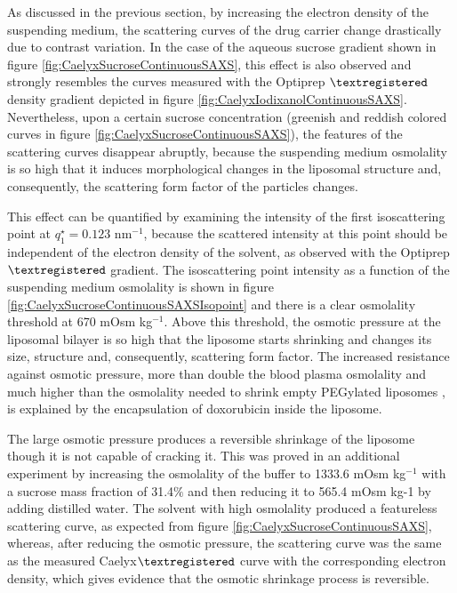 As discussed in the previous section, by increasing the electron density of the suspending medium, the scattering curves of the drug carrier change drastically due to contrast variation. In the case of the aqueous sucrose gradient shown in figure \ref{fig:CaelyxSucroseContinuousSAXS}, this effect is also observed and strongly resembles the curves measured with the Optiprep $\textregistered$ density gradient depicted in figure \ref{fig:CaelyxIodixanolContinuousSAXS}. Nevertheless, upon a certain sucrose concentration (greenish and reddish colored curves in figure \ref{fig:CaelyxSucroseContinuousSAXS}), the features of the scattering curves disappear abruptly, because the suspending medium osmolality is so high that it induces morphological changes in the liposomal structure and, consequently, the scattering form factor of the particles changes.

This effect can be quantified by examining the intensity of the first isoscattering point at $q^{\star}_1 = 0.123$ nm$^{-1}$, because the scattered intensity at this point should be independent of the electron density of the solvent, as observed with the Optiprep $\textregistered$ gradient. The isoscattering point intensity as a function of the suspending medium osmolality is shown in figure \ref{fig:CaelyxSucroseContinuousSAXSIsopoint} and there is a clear osmolality threshold at 670 mOsm kg$^{-1}$. Above this threshold, the osmotic pressure at the liposomal bilayer is so high that the liposome starts shrinking and changes its size, structure and, consequently, scattering form factor. The increased resistance against osmotic pressure, more than double the blood plasma osmolality and much higher than the osmolality needed to shrink empty PEGylated liposomes \cite{varga_osmotic_2014}, is explained by the encapsulation of doxorubicin inside the liposome.

The large osmotic pressure produces a reversible shrinkage of the liposome though it is not capable of cracking it. This was proved in an additional experiment by increasing the osmolality of the buffer to 1333.6 mOsm kg$^{-1}$ with a sucrose mass fraction of 31.4$\%$ and then reducing it to 565.4 mOsm kg-1 by adding distilled water. The solvent with high osmolality produced a featureless scattering curve, as expected from figure \ref{fig:CaelyxSucroseContinuousSAXS}, whereas, after reducing the osmotic pressure, the scattering curve was the same as the measured Caelyx$\textregistered$ curve with the corresponding electron density, which gives evidence that the osmotic shrinkage process is reversible.

